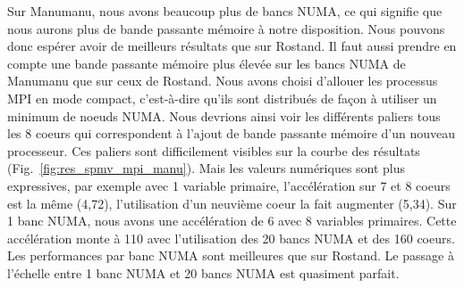 Sur Manumanu, nous avons beaucoup plus de bancs NUMA, ce qui signifie que nous aurons plus de bande passante mémoire à notre disposition.
%
Nous pouvons donc espérer avoir de meilleurs résultats que sur Rostand.
%
Il faut aussi prendre en compte une bande passante mémoire plus élevée sur les bancs NUMA de Manumanu que sur ceux de Rostand.
%
Nous avons choisi d'allouer les processus MPI en mode compact, c'est-à-dire qu'ils sont distribués de façon à utiliser un minimum de noeuds NUMA.
%
Nous devrions ainsi voir les différents paliers tous les 8 coeurs qui correspondent à l'ajout de bande passante mémoire d'un nouveau processeur.
%
Ces paliers sont difficilement visibles sur la courbe des résultats (Fig.~\ref{fig:res_spmv_mpi_manu}).
%
Mais les valeurs numériques sont plus expressives, par exemple avec 1 variable primaire, l'accélération sur 7 et 8 coeurs est la même (4,72), l'utilisation d'un neuvième coeur la fait augmenter (5,34).
%
Sur 1 banc NUMA, nous avons une accélération de 6 avec 8 variables primaires.
%
Cette accélération monte à 110 avec l'utilisation des 20 bancs NUMA et des 160 coeurs.
%
Les performances par banc NUMA sont meilleures que sur Rostand.
%
Le passage à l'échelle entre 1 banc NUMA et 20 bancs NUMA est quasiment parfait.

